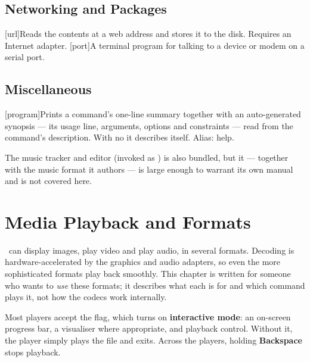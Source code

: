 \section{Networking and Packages}

\begin{outline}
\1[url]{Reads the contents at a web address and stores it to the disk. Requires an Internet adapter.}
\1[port]{A terminal program for talking to a device or modem on a serial port.}
\1
\end{outline}

\section{Miscellaneous}

\begin{outline}
\1[program]{Prints a command's one-line summary together with an auto-generated synopsis --- its usage line, arguments, options and constraints --- read from the command's  description. With no  it describes itself. Alias: help.}
\1
\1
\1
\end{outline}

The music tracker and editor (invoked as ) is also bundled, but it --- together with the music format it authors --- is large enough to warrant its own manual and is not covered here.



\chapter{Media Playback and Formats}

\thedos\ can display images, play video and play audio, in several formats. Decoding is hardware-accelerated by the graphics and audio adapters, so even the more sophisticated formats play back smoothly. This chapter is written for someone who wants to \emph{use} these formats; it describes what each is for and which command plays it, not how the codecs work internally.

Most players accept the  flag, which turns on \textbf{interactive mode}: an on-screen progress bar, a visualiser where appropriate, and playback control. Without it, the player simply plays the file and exits. Across the players, holding \textbf{Backspace} stops playback.


